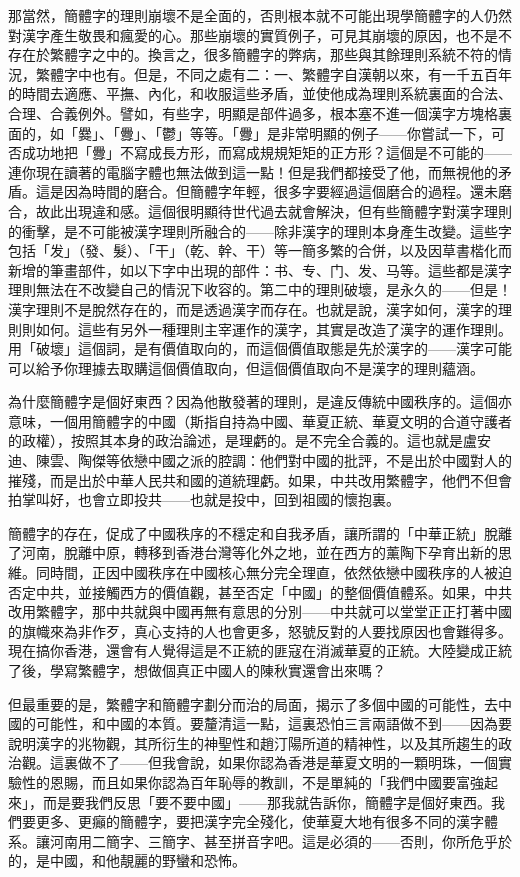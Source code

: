 那當然，簡體字的理則崩壞不是全面的，否則根本就不可能出現學簡體字的人仍然對漢字產生敬畏和瘋愛的心。那些崩壞的實質例子，可見其崩壞的原因，也不是不存在於繁體字之中的。換言之，很多簡體字的弊病，那些與其餘理則系統不符的情況，繁體字中也有。但是，不同之處有二：一、繁體字自漢朝以來，有一千五百年的時間去適應、平撫、內化，和收服這些矛盾，並使他成為理則系統裏面的合法、合理、合義例外。譬如，有些字，明顯是部件過多，根本塞不進一個漢字方塊格裏面的，如「爨」、「釁」、「鬱」等等。「釁」是非常明顯的例子——你嘗試一下，可否成功地把「釁」不寫成長方形，而寫成規規矩矩的正方形？這個是不可能的——連你現在讀著的電腦字體也無法做到這一點！但是我們都接受了他，而無視他的矛盾。這是因為時間的磨合。但簡體字年輕，很多字要經過這個磨合的過程。還未磨合，故此出現違和感。這個很明顯待世代過去就會解決，但有些簡體字對漢字理則的衝擊，是不可能被漢字理則所融合的——除非漢字的理則本身產生改變。這些字包括「发」（發、髮）、「干」（乾、幹、干）等一簡多繁的合併，以及因草書楷化而新增的筆畫部件，如以下字中出現的部件：书、专、门、发、马等。這些都是漢字理則無法在不改變自己的情況下收容的。第二中的理則破壞，是永久的——但是！漢字理則不是脫然存在的，而是透過漢字而存在。也就是說，漢字如何，漢字的理則則如何。這些有另外一種理則主宰運作的漢字，其實是改造了漢字的運作理則。用「破壞」這個詞，是有價值取向的，而這個價值取態是先於漢字的——漢字可能可以給予你理據去取購這個價值取向，但這個價值取向不是漢字的理則蘊涵。

為什麼簡體字是個好東西？因為他散發著的理則，是違反傳統中國秩序的。這個亦意味，一個用簡體字的中國（斯指自持為中國、華夏正統、華夏文明的合道守護者的政權），按照其本身的政治論述，是理虧的。是不完全合義的。這也就是盧安迪、陳雲、陶傑等依戀中國之派的腔調：他們對中國的批評，不是出於中國對人的摧殘，而是出於中華人民共和國的道統理虧。如果，中共改用繁體字，他們不但會拍掌叫好，也會立即投共——也就是投中，回到祖國的懷抱裏。

簡體字的存在，促成了中國秩序的不穩定和自我矛盾，讓所謂的「中華正統」脫離了河南，脫離中原，轉移到香港台灣等化外之地，並在西方的薰陶下孕育出新的思維。同時間，正因中國秩序在中國核心無分完全理直，依然依戀中國秩序的人被迫否定中共，並接觸西方的價值觀，甚至否定「中國」的整個價值體系。如果，中共改用繁體字，那中共就與中國再無有意思的分別——中共就可以堂堂正正打著中國的旗幟來為非作歹，真心支持的人也會更多，怒號反對的人要找原因也會難得多。現在搞你香港，還會有人覺得這是不正統的匪寇在消滅華夏的正統。大陸變成正統了後，學寫繁體字，想做個真正中國人的陳秋實還會出來嗎？

但最重要的是，繁體字和簡體字劃分而治的局面，揭示了多個中國的可能性，去中國的可能性，和中國的本質。要釐清這一點，這裏恐怕三言兩語做不到——因為要說明漢字的兆物觀，其所衍生的神聖性和趙汀陽所道的精神性，以及其所趨生的政治觀。這裏做不了——但我會說，如果你認為香港是華夏文明的一顆明珠，一個實驗性的恩賜，而且如果你認為百年恥辱的教訓，不是單純的「我們中國要富強起來」，而是要我們反思「要不要中國」——那我就告訴你，簡體字是個好東西。我們要更多、更癲的簡體字，要把漢字完全殘化，使華夏大地有很多不同的漢字體系。讓河南用二簡字、三簡字、甚至拼音字吧。這是必須的——否則，你所危乎於的，是中國，和他靚麗的野蠻和恐怖。